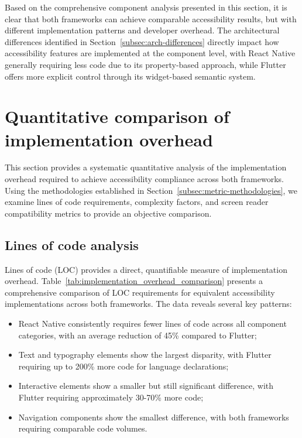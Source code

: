 {Based on the comprehensive component analysis presented in this section, it is clear that both frameworks can achieve comparable accessibility results, but with different implementation patterns and developer overhead. The architectural differences identified in Section~\ref{subsec:arch-differences} directly impact how accessibility features are implemented at the component level, with React Native generally requiring less code due to its property-based approach, while Flutter offers more explicit control through its widget-based semantic system.

\section{Quantitative comparison of implementation overhead}
\label{sec:quantitative-comparison}

This section provides a systematic quantitative analysis of the implementation overhead required to achieve accessibility compliance across both frameworks. Using the methodologies established in Section~\ref{subsec:metric-methodologies}, we examine lines of code requirements, complexity factors, and screen reader compatibility metrics to provide an objective comparison.

\subsection{Lines of code analysis}
\label{subsec:loc-analysis}

Lines of code (LOC) provides a direct, quantifiable measure of implementation overhead. Table~\ref{tab:implementation_overhead_comparison} presents a comprehensive comparison of LOC requirements for equivalent accessibility implementations across both frameworks. The data reveals several key patterns:

\begin{itemize}
    \item React Native consistently requires fewer lines of code across all component categories, with an average reduction of 45\% compared to Flutter;
    \item Text and typography elements show the largest disparity, with Flutter requiring up to 200\% more code for language declarations;
    \item Interactive elements show a smaller but still significant difference, with Flutter requiring approximately 30-70\% more code;
    \item Navigation components show the smallest difference, with both frameworks requiring comparable code volumes.
\end{itemize}

}
